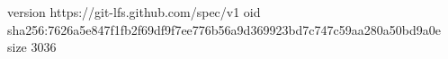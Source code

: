 version https://git-lfs.github.com/spec/v1
oid sha256:7626a5e847f1fb2f69df9f7ee776b56a9d369923bd7c747c59aa280a50bd9a0e
size 3036
